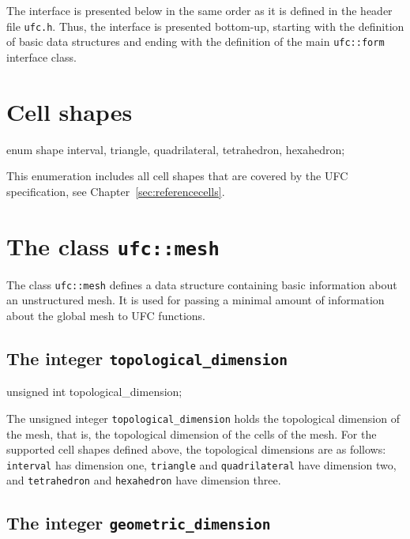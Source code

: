 The interface is presented below in the same order as it is defined in
the header file \texttt{ufc.h}. Thus, the interface is presented
bottom-up, starting with the definition of basic data structures and
ending with the definition of the main \texttt{ufc::form} interface
class.

\section{Cell shapes}

\begin{code}
enum shape {interval,
            triangle,
            quadrilateral,
            tetrahedron,
            hexahedron};
\end{code}

This enumeration includes all cell shapes that are covered by the UFC
specification, see Chapter~\ref{sec:referencecells}.

\section{The class \texttt{ufc::mesh}}

The class \texttt{ufc::mesh} defines a data structure containing basic
information about an unstructured mesh. It is used for passing a
minimal amount of information about the global mesh to UFC functions.

\subsection{The integer \texttt{topological\_dimension}}

\begin{code}
unsigned int topological_dimension;
\end{code}

The unsigned integer \texttt{topological\_dimension} holds the
topological dimension of the mesh, that is, the topological dimension
of the cells of the mesh. For the supported cell shapes defined above,
the topological dimensions are as follows: \texttt{interval} has
dimension one, \texttt{triangle} and \texttt{quadri\-lateral} have
dimension two, and \texttt{tetrahedron} and \texttt{hexahedron} have
dimension three.

\subsection{The integer \texttt{geometric\_dimension}}

